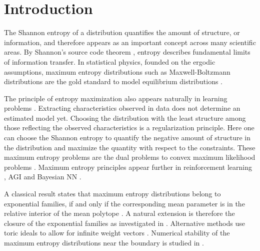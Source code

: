 \section{Introduction}

The Shannon entropy of a distribution quantifies the amount of structure, or information, and therefore appears as an important concept across many scientific areas.
By Shannon's source code theorem \cite{shannon_mathematical_1948}, entropy describes fundamental limits of information transfer.
In statistical physics, founded on the ergodic assumptions, maximum entropy distributions such as Maxwell-Boltzmann distributions are the gold standard to model equilibrium distributions \cite{uffink_compendium_2007,presse_principles_2013}.

The principle of entropy maximization also appears naturally in learning problems \cite{murphy_probabilistic_2023}.
Extracting characteristics observed in data does not determine an estimated model yet.
Choosing the distribution with the least structure among those reflecting the observed characteristics is a regularization principle.
Here one can choose the Shannon entropy to quantify the negative amount of structure in the distribution and maximize the quantity with respect to the constraints.
These maximum entropy problems are the dual problems to convex maximum likelihood problems \cite{koller_probabilistic_2009}.
Maximum entropy principles appear further in reinforcement learning \cite{yoon_maximum_2024,song_survey_2025}, AGI \cite{miotto_new_2025} and Bayesian NN \cite{rathnakumar_bayesian_2026}. %

A classical result states that maximum entropy distributions belong to exponential families, if and only if the corresponding mean parameter is in the relative interior of the mean polytope \cite{barndorff-nielsen_information_1978}.
A natural extension is therefore the closure of the exponential families as investigated in \cite{csiszar_closures_2005,malago_note_2010}.
Alternative methods use toric ideals to allow for infinite weight vectors \cite{sottile_toric_2008}.
Numerical stability of the maximum entropy distributions near the boundary is studied in \cite{straszak_computing_2017,straszak_maximum_2019}.

